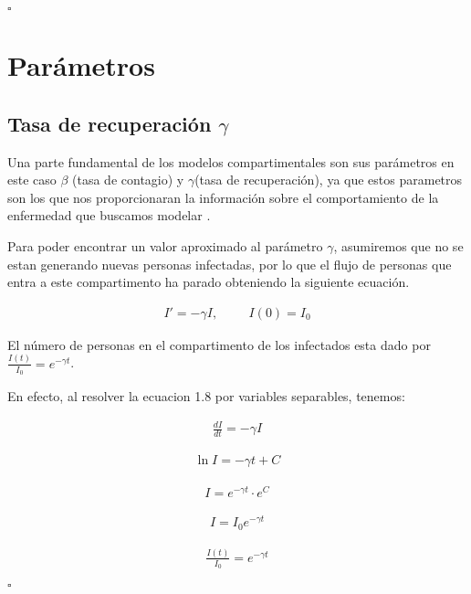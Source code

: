 \hfill	$\square$

\section{Parámetros}
\subsection{Tasa de recuperación \textbf{$\gamma$}}

Una parte fundamental de los modelos compartimentales son sus parámetros en este caso $\beta$ (tasa de contagio) y $\gamma$(tasa de recuperación), ya que estos parametros son los que nos proporcionaran la información sobre el comportamiento de la enfermedad que buscamos modelar \cite{Martcheva}.

Para poder encontrar un valor aproximado al parámetro $\gamma$, asumiremos que no se estan generando nuevas personas infectadas, por lo que el flujo de personas que entra a este compartimento ha parado obteniendo la siguiente ecuación.

\begin{align}
I' = -\gamma I, \hspace{1cm} I(0) = I_{0}
\end{align}

\begin{Af}

El número de personas en el compartimento de los infectados esta dado por $\frac{I(t)}{I_{0}} = e^{-\gamma t}$.

\end{Af}

\begin{Dem}
En efecto, al resolver la ecuacion 1.8 por variables separables, tenemos: 

\begin{align*}
\frac{dI}{dt} = - \gamma I
\end{align*}

\begin{align*}
\ln{I} = - \gamma t + C
\end{align*}

\begin{align*}
I = e^{- \gamma t} \cdot e^{C}
\end{align*}

\begin{align*}
I = I_{0} e^{- \gamma t}
\end{align*}

\begin{align*}
\frac{I(t)}{I_{0}} = e^{-\gamma t}
\end{align*}

\hfill	$\square$

\end{Dem}

